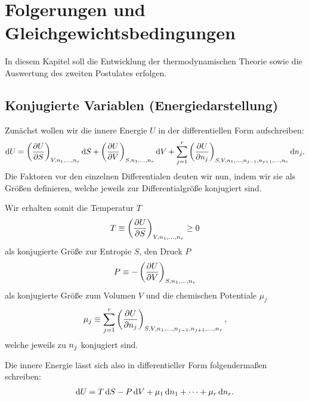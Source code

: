 
\section{Folgerungen und Gleichgewichtsbedingungen}

In diesem Kapitel soll die Entwicklung der thermodynamischen Theorie sowie die Auswertung des zweiten Postulates erfolgen.

\subsection{Konjugierte Variablen (Energiedarstellung)}

Zunächst wollen wir die innere Energie $U$ in der differentiellen Form aufschreiben:
\begin{align*}
    \mathop{}\!\mathrm{d} U = \left(\frac{\partial U}{\partial S}\right)_{V,n_1,\ldots,n_r} \mathop{}\!\mathrm{d} S + \left(\frac{\partial U}{\partial V}\right)_{S,n_1,\ldots,n_r} \mathop{}\!\mathrm{d} V + \sum_{j = 1}^r \left(\frac{\partial U}{\partial n_j}\right)_{S,V,n_1,\ldots,n_{j - 1},n_{j + 1},\ldots,n_r} \mathop{}\!\mathrm{d} n_j.
\end{align*}
Die Faktoren vor den einzelnen Differentialen deuten wir nun, indem wir sie als Größen definieren, welche jeweils zur Differentialgröße konjugiert sind.

Wir erhalten somit die Temperatur $T$
\begin{align}
    \label{eq:def_temperatur}
    T \equiv \left(\frac{\partial U}{\partial S}\right)_{V,n_1,\ldots,n_r} \geq 0
\end{align}
als konjugierte Größe zur Entropie $S$, den Druck $P$
\begin{align}
    \label{eq:def_druck}
    P \equiv -\left(\frac{\partial U}{\partial V}\right)_{S,n_1,\ldots,n_r}
\end{align}
als konjugierte Größe zum Volumen $V$ und die chemischen Potentiale $\mu_j$
\begin{align}
    \label{eq:def_chemische_potentiale}
    \mu_j \equiv \sum_{j = 1}^r \left(\frac{\partial U}{\partial n_j}\right)_{S,V,n_1,\ldots,n_{j - 1},n_{j + 1},\ldots,n_r},
\end{align}
welche jeweils zu $n_j$ konjugiert sind.

Die innere Energie lässt sich also in differentieller Form folgendermaßen schreiben:
\begin{align}
    \label{eq:innere_energie_differentielle_form}
    \mathop{}\!\mathrm{d} U = T\mathop{}\!\mathrm{d} S - P \mathop{}\!\mathrm{d} V + \mu_1 \mathop{}\!\mathrm{d} n_1 + \cdots + \mu_r \mathop{}\!\mathrm{d} n_r.
\end{align}

